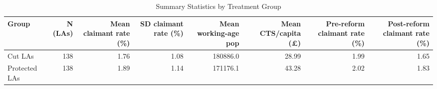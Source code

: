 \begin{table}[!h]
\centering
\caption{\label{tab:tab:sumstats}Summary Statistics by Treatment Group}
\centering
\begin{tabular}[t]{lrrrrrrr}
\toprule
Group & N (LAs) & Mean claimant rate (\%) & SD claimant rate (\%) & Mean working-age pop & Mean CTS/capita (£) & Pre-reform claimant rate (\%) & Post-reform claimant rate (\%)\\
\midrule
Cut LAs & 138 & 1.76 & 1.08 & 180886.0 & 28.99 & 1.99 & 1.65\\
Protected LAs & 138 & 1.89 & 1.14 & 171176.1 & 43.28 & 2.02 & 1.83\\
\bottomrule
\end{tabular}
\end{table}
